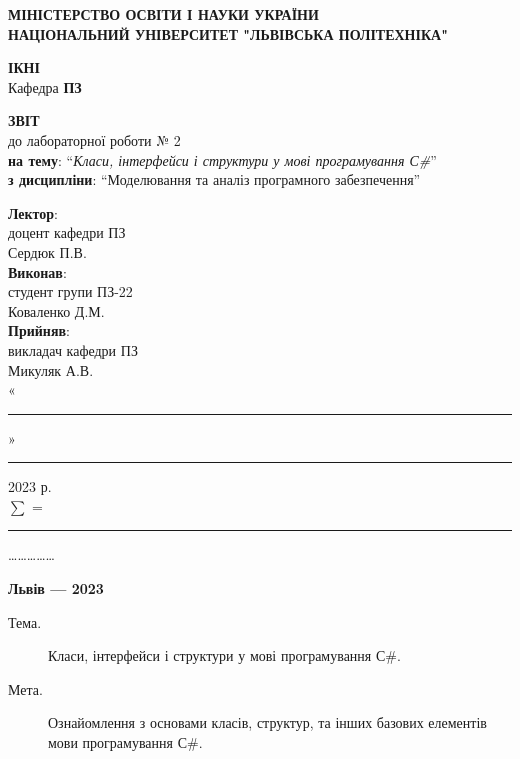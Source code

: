 \documentclass[oneside,14pt]{extarticle}
\newcommand\subject{Моделювання та аналіз програмного забезпечення}
\newcommand\lecturer{доцент кафедри ПЗ \\ Сердюк П.В.}
\newcommand\teacher{викладач кафедри ПЗ \\ Микуляк А.В.}
\newcommand\mygroup{ПЗ-22}
\newcommand\lab{2}
\newcommand\theme{Класи, інтерфейси і структури у
	мові програмування С\#}
\newcommand\purpose{Ознайомлення з основами класів, структур, та інших базових
	елементів мови програмування С\#}
\begin{document}
\begin{normalsize}
	\begin{titlepage}
		\thispagestyle{empty}
		\begin{center}
			\textbf{МІНІСТЕРСТВО ОСВІТИ І НАУКИ УКРАЇНИ\\
				НАЦІОНАЛЬНИЙ УНІВЕРСИТЕТ "ЛЬВІВСЬКА ПОЛІТЕХНІКА"}
		\end{center}
		\begin{flushright}
			\textbf{ІКНІ}\\
			Кафедра \textbf{ПЗ}
		\end{flushright}
		\vspace{70pt}
		\begin{center}
			\textbf{ЗВІТ}\\
			\vspace{10pt}
			до лабораторної роботи № \lab\\
			\textbf{на тему}: “\textit{\theme}”\\
			\textbf{з дисципліни}: “\subject”
		\end{center}
		\vspace{50pt}
		\begin{flushright}
			
			\textbf{Лектор}:\\
			\lecturer\\
			\vspace{10pt}
			\textbf{Виконав}:\\
			
			студент групи \mygroup\\
			Коваленко Д.М.\\
			\vspace{10pt}
			\textbf{Прийняв}:\\
			
			\teacher\\
			
			\vspace{28pt}
			«\rule{1cm}{0.15mm}» \rule{1.5cm}{0.15mm} 2023 р.\\
			$\sum$ = \rule{1cm}{0.15mm}……………\\
			
		\end{flushright}
		\vspace{\fill}
		\begin{center}
			\textbf{Львів — 2023}
		\end{center}
	\end{titlepage}
		
	\begin{description}
		\item[Тема.] \theme.
		\item[Мета.] \purpose.
	\end{description}


\end{normalsize}
\end{document}
